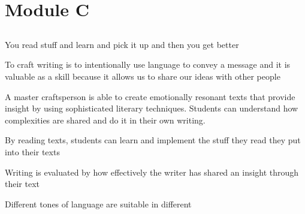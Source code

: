 
\chapter{Module C}

\section{}

You read stuff and learn and pick it up and then you get better

To craft writing is to intentionally use language to convey a message and it is valuable as a skill because it allows us to share our ideas with other people

A master craftsperson is able to create emotionally resonant texts that provide insight by using sophisticated literary techniques. Students can understand how complexities are shared and do it in their own writing.

By reading texts, students can learn and implement the stuff they read they put into their texts

Writing is evaluated by how effectively the writer has shared an insight through their text

Different tones of language are suitable in different
